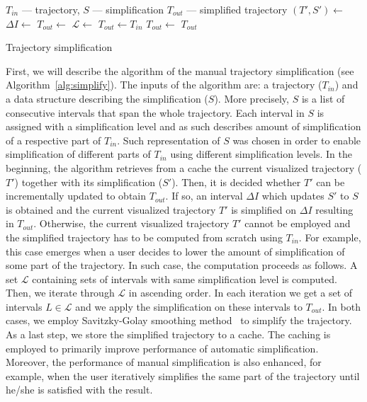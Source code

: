 \begin{algorithm}
  \begin{algorithmic}[1]
	  \Require $T_{in}$ --- trajectory, $S$ --- simplification
	  \Ensure $T_{out}$ --- simplified trajectory
			\State $(T', S') \gets$  
			\State
			  \State $\Delta I \gets$ 
				\State $T_{out} \gets$ 
			\Else %
			  \State $\mathcal{L} \gets$  
				\State $T_{out} \gets T_{in}$
				 
					  \State $T_{out} \gets$ 
					\EndFor
				\EndFor
			\EndIf
			\State
			\State {}
			\State \Return $T_{out}$
		\EndProcedure
  \end{algorithmic}
	\caption{Trajectory simplification}
  \label{alg:simplify}
\end{algorithm}

First, we will describe the algorithm of the manual trajectory simplification (see Algorithm~\ref{alg:simplify}).
The inputs of the algorithm are: a trajectory ($T_{in}$) and a data structure describing the simplification ($S$).
More precisely, $S$ is a list of consecutive intervals that span the whole trajectory.
Each interval in $S$ is assigned with a simplification level and as such describes amount of simplification of a respective part of $T_{in}$.
Such representation of $S$ was chosen in order to enable simplification of different parts of $T_{in}$ using different simplification levels.
In the beginning, the algorithm retrieves from a cache the current visualized trajectory ($T'$) together with its simplification ($S'$).
Then, it is decided whether $T'$ can be incrementally updated to obtain $T_{out}$.
If so, an interval $\Delta I$ which updates $S'$ to $S$ is obtained and the current visualized trajectory $T'$ is simplified on $\Delta I$ resulting in $T_{out}$.
Otherwise, the current visualized trajectory $T'$ cannot be employed and the simplified trajectory has to be computed from scratch using $T_{in}$.
For example, this case emerges when a user decides to lower the amount of simplification of some part of the trajectory.
In such case, the computation proceeds as follows.
A set $\mathcal{L}$ containing sets of intervals with same simplification level is computed.
Then, we iterate through $\mathcal{L}$ in ascending order.
In each iteration we get a set of intervals $L \in \mathcal{L}$ and we apply the simplification on these intervals to $T_{out}$.
In both cases, we employ Savitzky-Golay smoothing method~\cite{savitzky1964smoothing} to simplify the trajectory.
As a last step, we store the simplified trajectory to a cache.
The caching is employed to primarily improve performance of automatic simplification.
Moreover, the performance of manual simplification is also enhanced, for example, when the user iteratively simplifies the same part of the trajectory until he/she is satisfied with the result.


